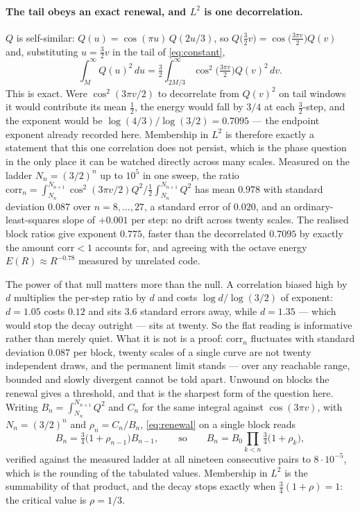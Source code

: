 \documentclass[11pt]{article}
\theoremstyle{remark}
\begin{document}
\paragraph{The tail obeys an exact renewal, and $L^2$ is one decorrelation.} $Q$ is self-similar:
$Q(u)=\cos(\pi u)\,Q(2u/3)$, so $Q\bigl(\tfrac32v\bigr)=\cos\bigl(\tfrac{3\pi v}{2}\bigr)Q(v)$ and,
substituting $u=\tfrac32v$ in the tail of \eqref{eq:constant},
\begin{equation}\label{eq:renewal}
  \int_M^\infty Q(u)^2\,du=\tfrac32\int_{2M/3}^\infty\cos^2\bigl(\tfrac{3\pi v}{2}\bigr)Q(v)^2\,dv .
\end{equation}
This is exact. Were $\cos^2(3\pi v/2)$ to decorrelate from $Q(v)^2$ on tail windows it would contribute
its mean $\tfrac12$, the energy would fall by $3/4$ at each $\tfrac32$-step, and the exponent would be
$\log(4/3)/\log(3/2)=0.7095$ --- the endpoint exponent already recorded here. Membership in $L^2$ is
therefore exactly a statement that this one correlation does not persist, which is the phase question in
the only place it can be watched directly across many scales.
Measured on the ladder $N_n=(3/2)^n$ up to $10^5$ in one sweep, the ratio
$\mathrm{corr}_n=\int_{N_n}^{N_{n+1}}\cos^2(3\pi v/2)Q^2\big/\tfrac12\int_{N_n}^{N_{n+1}}Q^2$ has mean
$0.978$ with standard deviation $0.087$ over $n=8,\dots,27$, a standard error of $0.020$, and an
ordinary-least-squares slope of $+0.001$ per step: no drift across twenty scales. The realised block
ratios give exponent $0.775$, faster than the decorrelated $0.7095$ by exactly the amount
$\mathrm{corr}<1$ accounts for, and agreeing with the octave energy $E(R)\approx R^{-0.78}$ measured by
unrelated code.

The power of that null matters more than the null. A correlation biased high by $d$ multiplies the
per-step ratio by $d$ and costs $\log d/\log(3/2)$ of exponent: $d=1.05$ costs $0.12$ and sits $3.6$
standard errors away, while $d=1.35$ --- which would stop the decay outright --- sits at twenty. So the
flat reading is informative rather than merely quiet. What it is not is a proof: $\mathrm{corr}_n$
fluctuates with standard deviation $0.087$ per block, twenty scales of a single curve are not twenty
independent draws, and the permanent limit stands --- over any reachable range, bounded and slowly
divergent cannot be told apart.
Unwound on blocks the renewal gives a threshold, and that is the sharpest form of the question here.
Writing $B_n=\int_{N_n}^{N_{n+1}}Q^2$ and $C_n$ for the same integral against $\cos(3\pi v)$, with
$N_n=(3/2)^n$ and $\rho_n=C_n/B_n$, \eqref{eq:renewal} on a single block reads
\begin{equation}\label{eq:blocks}
  B_n=\tfrac34\bigl(1+\rho_{n-1}\bigr)B_{n-1},\qquad\text{so}\qquad
  B_n=B_0\prod_{k<n}\tfrac34\bigl(1+\rho_k\bigr),
\end{equation}
verified against the measured ladder at all nineteen consecutive pairs to $8\cdot10^{-5}$, which is the
rounding of the tabulated values. Membership in $L^2$ is the summability of that product, and the decay
stops exactly when $\tfrac34(1+\rho)=1$: the critical value is $\rho=1/3$.
\end{document}
